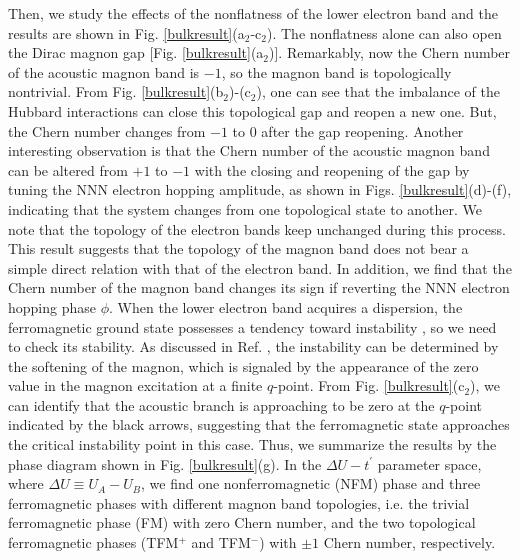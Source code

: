 \documentclass[amsmath,superscriptaddress,showpacs,aps,prl,twocolumn]{revtex4-1}
\begin{document}
\par Then, we study the effects of the nonflatness of the lower electron band and the results are shown in Fig. \ref{bulkresult}(a$_2$-c$_2$). The nonflatness alone can also open the Dirac magnon gap [Fig. \ref{bulkresult}(a$_2$)]. Remarkably, now the Chern number of the acoustic magnon band is $-1$, so the magnon band is topologically nontrivial. From Fig. \ref{bulkresult}(b$_2$)-(c$_2$), one can see that the imbalance of the Hubbard interactions can close this topological gap and reopen a new one. But, the Chern number changes from $-1$ to 0 after the gap reopening. Another interesting observation is that the Chern number of the acoustic magnon band can be altered from $+1$ to $-1$ with the closing and reopening of the gap by tuning the NNN electron hopping amplitude, as shown in Figs. \ref{bulkresult}(d)-(f), indicating that the system changes from one topological state to another. We note that the topology of the electron bands keep unchanged during this process. This result suggests that the topology of the magnon band does not bear a simple direct relation with that of the electron band. In addition, we find that the Chern number of the magnon band changes its sign if reverting the NNN electron hopping phase $\phi$. When the lower electron band acquires a dispersion, the ferromagnetic ground state possesses a tendency toward instability \cite{Tasaki_PRL1994,Su_PRB2019}, so we need to check its stability. As discussed in Ref. \cite{Su_PRB2019}, the instability can be determined by the softening of the magnon, which is signaled by the appearance of the zero value in the magnon excitation at a finite $q$-point. From Fig. \ref{bulkresult}(c$_2$), we can identify that the acoustic branch is approaching to be zero at the $q$-point indicated by the black arrows, suggesting that the ferromagnetic state approaches the critical instability point in this case. Thus, we summarize the results by the phase diagram shown in Fig. \ref{bulkresult}(g). In the $\Delta U-t^\prime$ parameter space, where $\Delta U\equiv U_A-U_B$, we find one nonferromagnetic (NFM) phase and three ferromagnetic phases with different magnon band topologies, i.e. the trivial ferromagnetic phase (FM) with zero Chern number, and the two topological ferromagnetic phases (TFM$^+$ and TFM$^-$) with $\pm1$ Chern number, respectively.
\end{document}
